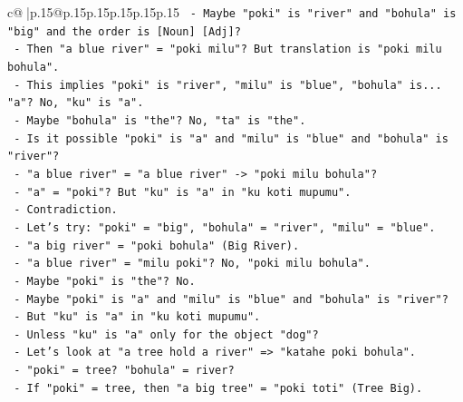 \documentclass{article}
\begin{document}
{\begin{supertabular}{c@{$\;$}|p{.15\linewidth}@{}p{.15\linewidth}p{.15\linewidth}p{.15\linewidth}p{.15\linewidth}p{.15\linewidth}}
{{{\texttt{                                    {-} Maybe "poki" is "river" and "bohula" is "big" and the order is {[}Noun{]} {[}Adj{]}?} \\
\texttt{                                    {-} Then "a blue river" = "poki milu"? But translation is "poki milu bohula".} \\
\texttt{                                    {-} This implies "poki" is "river", "milu" is "blue", "bohula" is... "a"? No, "ku" is "a".} \\
\texttt{                                    {-} Maybe "bohula" is "the"? No, "ta" is "the".} \\
\texttt{                                    {-} Is it possible "poki" is "a" and "milu" is "blue" and "bohula" is "river"?} \\
\texttt{                                    {-} "a blue river" = "a blue river" {-}> "poki milu bohula"?} \\
\texttt{                                    {-} "a" = "poki"? But "ku" is "a" in "ku koti mupumu".} \\
\texttt{                                    {-} Contradiction.} \\
\texttt{                                    {-} Let's try: "poki" = "big", "bohula" = "river", "milu" = "blue".} \\
\texttt{                                    {-} "a big river" = "poki bohula" (Big River).} \\
\texttt{                                    {-} "a blue river" = "milu poki"? No, "poki milu bohula".} \\
\texttt{                                    {-} Maybe "poki" is "the"? No.} \\
\texttt{                                    {-} Maybe "poki" is "a" and "milu" is "blue" and "bohula" is "river"?} \\
\texttt{                                    {-} But "ku" is "a" in "ku koti mupumu".} \\
\texttt{                                    {-} Unless "ku" is "a" only for the object "dog"?} \\
\texttt{                                    {-} Let's look at "a tree hold a river" => "katahe poki bohula".} \\
\texttt{                                      {-} "poki" = tree? "bohula" = river?} \\
\texttt{                                      {-} If "poki" = tree, then "a big tree" = "poki toti" (Tree Big).} \\
}}}
\end{supertabular}}
\end{document}
